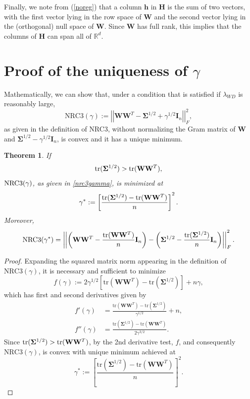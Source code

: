 \documentclass{article}
\theoremstyle{plain}
\newtheorem{theorem}{Theorem}[section]
\theoremstyle{definition}
\theoremstyle{remark}
\newcommand{\bW}{{\mathbf W}}
\newcommand{\bH}{{\mathbf H}}
\newcommand{\bI}{{\mathbf I}}
\newcommand{\bh}{{\mathbf h}}
\newcommand{\bSigma}{{\mathbf \Sigma}}
\newcommand{\Rd}{\mathbb{R}^d}
\begin{document}
Finally, we note from  (\ref{noreg}) that a column $\bh$ in $\bH$ is the sum of two vectors, with the first vector lying in the row space of $\bW$ and the second vector lying in the (orthogonal) null space of $\bW$. Since $\bW$ has full rank, this implies that the columns of $\bH$ can span all of $\Rd$.

\section{Proof of the uniqueness of $\gamma$}
\label{appendix:unique_gamma}
Mathematically, we can show that, under a condition that is satisfied if $\lambda_{WD}$ is reasonably large, 
\begin{equation} \label{nrc3gamma}
\text{NRC3}(\gamma):=\left|\left| \bW \bW^T-\bSigma^{1/2} + \gamma^{1/2} \bI_n\right|\right|_F^2,
\end{equation}
as given in the definition of NRC3, without normalizing the Gram matrix of $\bW$ and $\bSigma^{1/2} - \gamma^{1/2} \bI_n$, is convex and it has a unique minimum.

\begin{theorem}
\label{thm:unique_gamma}
If 
\[
\textnormal{tr}(\bSigma^{1/2})>\textnormal{tr}(\bW \bW^T),
\]
$\textnormal{NRC3}(\gamma)$, as given in \eqref{nrc3gamma}, is minimized at
\[
\gamma^*:=\left[\frac{\textnormal{tr}(\bSigma^{1/2})-\textnormal{tr}(\bW \bW^T)}{n}\right]^2.
\]
Moreover, 
\[
\textnormal{NRC3}(\gamma^*)=\left|\left|\left(\bW \bW^T-\frac{\textnormal{tr}(\bW \bW^T)}{n} \bI_n\right) - \left(\bSigma^{1/2}-\frac{\textnormal{tr}(\bSigma^{1/2})}{n} \bI_n\right)\right|\right|_F^2.
\]
\end{theorem}

\begin{proof}

Expanding the squared matrix norm appearing in the definition of $\text{NRC3}(\gamma)$, it is necessary and sufficient to minimize
\[
f(\gamma):= 2 \gamma^{1/2} \left[\text{tr}(\bW \bW^T)-\text{tr}(\bSigma^{1/2})\right] + n \gamma,
\]
which has first and second derivatives given by
\begin{align*}
f'(\gamma)&=\frac{\text{tr}(\bW \bW^T)-\text{tr}(\bSigma^{1/2})}{\gamma^{1/2}}+n,
\\
f''(\gamma)&=\frac{\text{tr}(\bSigma^{1/2})-\text{tr}(\bW \bW^T)}{2 \gamma^{3/2}}.
\end{align*}
Since 
$\text{tr}(\bSigma^{1/2})>\textnormal{tr}(\bW\bW^T)$, by the 2nd derivative test, $f$, and consequently $\text{NRC3}(\gamma)$, is convex with unique minimum achieved at 
\[
\gamma^*:=\left[\frac{\text{tr}(\bSigma^{1/2})-\text{tr}(\bW \bW^T)}{n}\right]^2.
\]

\end{proof}
\end{document}

